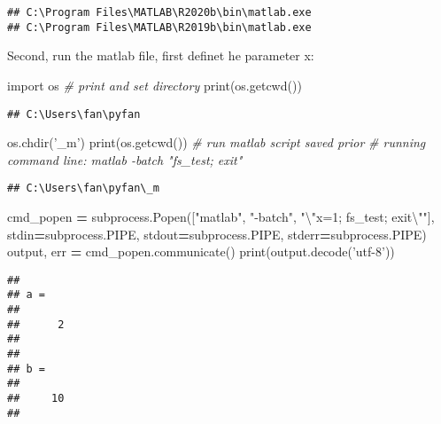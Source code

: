 \documentclass[
]{book}
\newenvironment{Shaded}{\begin{snugshade}}{\end{snugshade}}
\newcommand{\BuiltInTok}[1]{#1}
\newcommand{\CharTok}[1]{\textcolor[rgb]{0.31,0.60,0.02}{#1}}
\newcommand{\CommentTok}[1]{\textcolor[rgb]{0.56,0.35,0.01}{\textit{#1}}}
\newcommand{\ImportTok}[1]{#1}
\newcommand{\NormalTok}[1]{#1}
\newcommand{\OperatorTok}[1]{\textcolor[rgb]{0.81,0.36,0.00}{\textbf{#1}}}
\newcommand{\StringTok}[1]{\textcolor[rgb]{0.31,0.60,0.02}{#1}}
\begin{document}
\begin{verbatim}
## C:\Program Files\MATLAB\R2020b\bin\matlab.exe
## C:\Program Files\MATLAB\R2019b\bin\matlab.exe
\end{verbatim}

Second, run the matlab file, first definet he parameter x:

\begin{Shaded}
\begin{Highlighting}[]
\ImportTok{import}\NormalTok{ os}
\CommentTok{# print and set directory}
\BuiltInTok{print}\NormalTok{(os.getcwd())}
\end{Highlighting}
\end{Shaded}

\begin{verbatim}
## C:\Users\fan\pyfan
\end{verbatim}

\begin{Shaded}
\begin{Highlighting}[]
\NormalTok{os.chdir(}\StringTok{'_m'}\NormalTok{)}
\BuiltInTok{print}\NormalTok{(os.getcwd())}
\CommentTok{# run matlab script saved prior}
\CommentTok{# running command line: matlab -batch "fs_test; exit"}
\end{Highlighting}
\end{Shaded}

\begin{verbatim}
## C:\Users\fan\pyfan\_m
\end{verbatim}

\begin{Shaded}
\begin{Highlighting}[]
\NormalTok{cmd_popen }\OperatorTok{=}\NormalTok{ subprocess.Popen([}\StringTok{"matlab"}\NormalTok{, }\StringTok{"-batch"}\NormalTok{, }\StringTok{"}\CharTok{\textbackslash{}"}\StringTok{x=1; fs_test; exit}\CharTok{\textbackslash{}"}\StringTok{"}\NormalTok{],}
\NormalTok{                             stdin}\OperatorTok{=}\NormalTok{subprocess.PIPE,}
\NormalTok{                             stdout}\OperatorTok{=}\NormalTok{subprocess.PIPE,}
\NormalTok{                             stderr}\OperatorTok{=}\NormalTok{subprocess.PIPE)}
\NormalTok{output, err }\OperatorTok{=}\NormalTok{ cmd_popen.communicate()}
\BuiltInTok{print}\NormalTok{(output.decode(}\StringTok{'utf-8'}\NormalTok{))}
\end{Highlighting}
\end{Shaded}

\begin{verbatim}
## 
## a =
## 
##      2
## 
## 
## b =
## 
##     10
## 
\end{verbatim}
\end{document}
